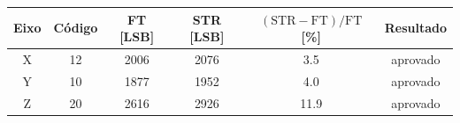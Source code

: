 \begin{tabular}{cccccc}
\toprule
Eixo & Código & FT [LSB] & STR [LSB] & $(\mathrm{STR}-\mathrm{FT})/\mathrm{FT}$ [\%] & Resultado \\
\midrule
X & 12 & \num{2006} & \num{2076} & \num{+3.5} & aprovado \\
Y & 10 & \num{1877} & \num{1952} & \num{+4.0} & aprovado \\
Z & 20 & \num{2616} & \num{2926} & \num{+11.9} & aprovado \\
\bottomrule
\end{tabular}
